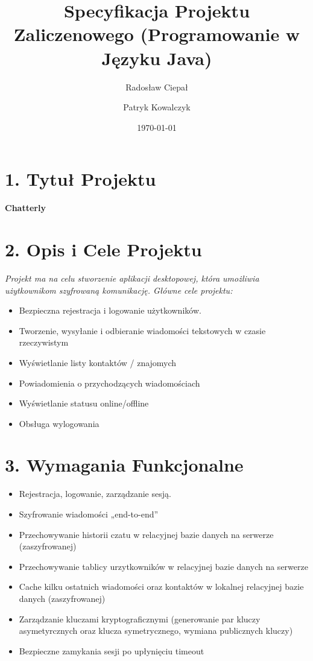 \documentclass[a4paper,12pt]{article}
\title{Specyfikacja Projektu Zaliczenowego (Programowanie w Języku Java)}
\author{Radosław Ciepał \and Patryk Kowalczyk}
\date{\today}
\begin{document}
\maketitle

\section*{1. Tytuł Projektu}

\vspace{0.5 cm}
 \noindent
\textbf{Chatterly}

\section*{2. Opis i Cele Projektu}

\vspace{0.5 cm}
 \noindent

\textit{ Projekt ma na celu stworzenie aplikacji desktopowej, która umożliwia użytkownikom szyfrowaną komunikację. Główne cele projektu:}

\begin{itemize}
    \item Bezpieczna rejestracja i logowanie użytkowników.
    \item Tworzenie, wysyłanie i odbieranie wiadomości tekstowych w czasie rzeczywistym
    \item Wyświetlanie listy kontaktów / znajomych
    \item Powiadomienia o przychodzących wiadomościach
    \item Wyświetlanie statusu online/offline
    \item Obsługa wylogowania
\end{itemize}

\section*{3. Wymagania Funkcjonalne}

\vspace{0.5 cm}
 \noindent

\begin{itemize}
    \item Rejestracja, logowanie, zarządzanie sesją.
    \item Szyfrowanie wiadomości „end-to-end”
    \item Przechowywanie historii czatu w relacyjnej bazie danych na serwerze (zaszyfrowanej)
    \item Przechowywanie tablicy urzytkowników w relacyjnej bazie danych na serwerze
    \item Cache kilku ostatnich wiadomości oraz kontaktów w lokalnej relacyjnej bazie danych (zaszyfrowanej)
    \item Zarządzanie kluczami kryptograficznymi (generowanie par kluczy asymetyrcznych oraz klucza symetrycznego, wymiana publicznych kluczy)
    \item Bezpieczne zamykania sesji po upłynięciu timeout
\end{itemize}
\end{document}
